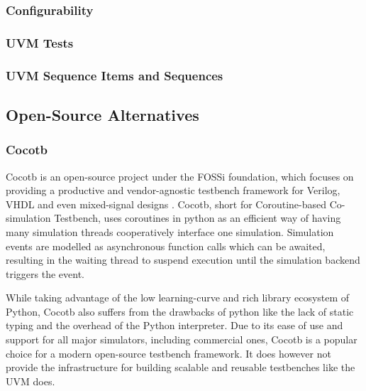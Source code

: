 \documentclass[12pt]{report}
\begin{document}
\subsubsection{Configurability} %

\subsubsection{UVM Tests} %

\subsubsection{UVM Sequence Items and Sequences} %

\subsection{Open-Source Alternatives} %

\subsubsection{Cocotb} %

Cocotb is an open-source project under the FOSSi foundation, which focuses on providing a productive and
vendor-agnostic testbench framework for Verilog, VHDL and even mixed-signal designs \cite{cocotb}. Cocotb, short for
Coroutine-based Co-simulation Testbench, uses coroutines in python as an efficient way of having many simulation
threads cooperatively interface one simulation. Simulation events are modelled as asynchronous function calls which
can be awaited, resulting in the waiting thread to suspend execution until the simulation backend triggers the event.

While taking advantage of the low learning-curve and rich library ecosystem of Python, Cocotb also suffers from the
drawbacks of python like the lack of static typing and the overhead of the Python interpreter. Due to its ease of use
and support for all major simulators, including commercial ones, Cocotb is a popular choice for a modern open-source
testbench framework. It does however not provide the infrastructure for building scalable and reusable testbenches
like the UVM does.
\end{document}
